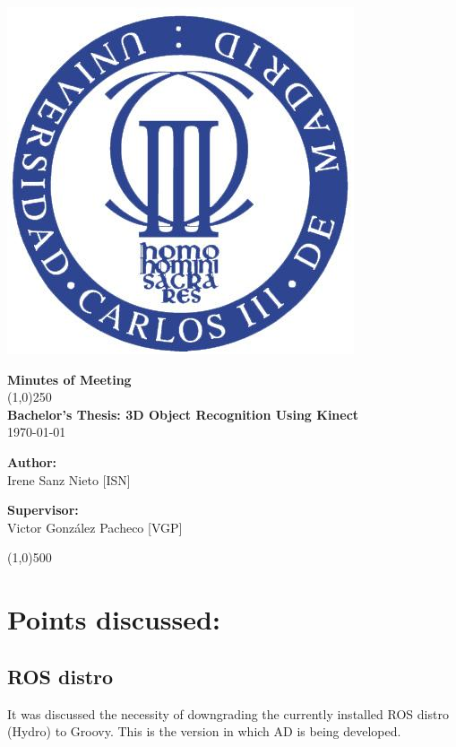 \documentclass{article}
\newenvironment{myindentpar}[1]%
 {\begin{list}{}%
         {\setlength{\leftmargin}{#1}}%
         \item[]%
 }
 {\end{list}}
\begin{document}
\includegraphics[width=0.1\linewidth]{../template/uc3m.jpg}

\vspace{-1cm}
\begin{minipage}[b]{1\linewidth}
	\begin{center}
	{\Huge \bfseries{Minutes of Meeting}}\\
	\line(1,0){250}\\[1cm]
	{\LARGE \textbf{Bachelor's Thesis: 3D Object Recognition Using Kinect}}\\[0.5cm]
	{\large \today}
	\end{center}
\end {minipage}



\begin{minipage}{0.55\textwidth}
\begin{flushleft} \large
\textbf{{Author:}\\}
Irene Sanz Nieto [ISN]\\
\end{flushleft}
\end{minipage}
\begin{minipage}{0.4\textwidth}
\begin{flushright} \large
\textbf{Supervisor: }\\
Victor González Pacheco [VGP]
\end{flushright}\end{minipage}

\begin{center}
\line(1,0){500}
\end{center}

\renewcommand{\thesubsection}
{\hspace*{1cm} \arabic{section}.\arabic{subsection}}



\section{\LARGE Points discussed: }
	\subsection{ROS distro}
		\begin{myindentpar}{1cm} 
		It was discussed the necessity of downgrading the currently installed ROS distro (Hydro) to Groovy. This is the version in which AD is being developed.  
		\end{myindentpar}
		
\end{document}
